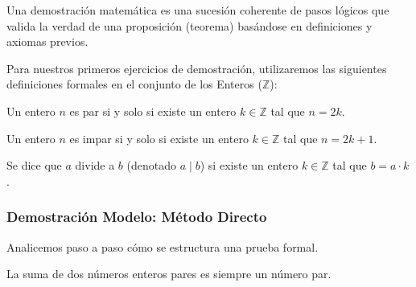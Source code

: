 Una demostración matemática es una sucesión coherente de pasos lógicos que valida la verdad de una proposición (teorema) basándose en definiciones y axiomas previos.

Para nuestros primeros ejercicios de demostración, utilizaremos las siguientes definiciones formales en el conjunto de los Enteros ($\mathbb{Z}$):

\begin{definicion}
Un entero $n$ es par si y solo si existe un entero $k \in \mathbb{Z}$ tal que $n = 2k$.
\end{definicion}

\begin{definicion}
Un entero $n$ es impar si y solo si existe un entero $k \in \mathbb{Z}$ tal que $n = 2k + 1$.
\end{definicion}

\begin{definicion}[Divisibilidad]
Se dice que $a$ divide a $b$ (denotado $a \mid b$) si existe un entero $k \in \mathbb{Z}$ tal que $b = a \cdot k$.
\end{definicion}

\subsubsection{Demostración Modelo: Método Directo}

Analicemos paso a paso cómo se estructura una prueba formal.

\begin{teorema}
La suma de dos números enteros pares es siempre un número par.
\end{teorema}

